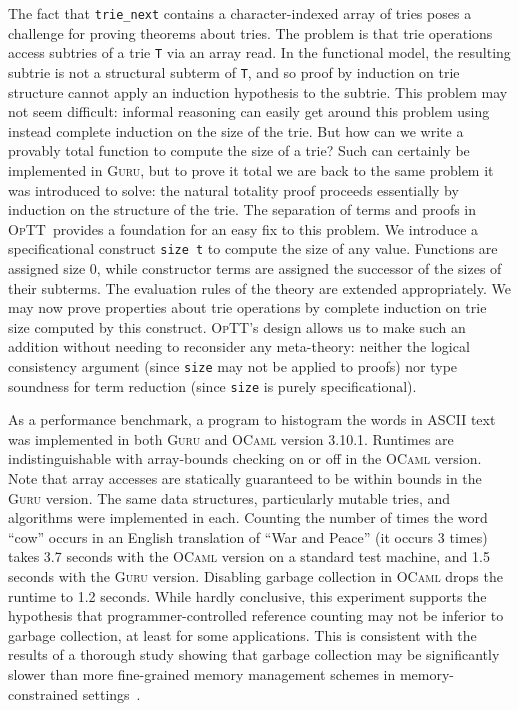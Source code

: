 \documentclass[preprint,natbib]{sigplanconf}
\newcommand{\optt}{\textsc{OpTT}}
\begin{document}
The fact that \texttt{trie\_next} contains a character-indexed array
of tries poses a challenge for proving theorems about tries.  The
problem is that trie operations access subtries of a trie \texttt{T}
via an array read.  In the functional model, the resulting subtrie is
not a structural subterm of \texttt{T}, and so proof by induction on
trie structure cannot apply an induction hypothesis to the subtrie.
This problem may not seem difficult: informal reasoning can easily get
around this problem using instead complete induction on the size of
the trie.  But how can we write a provably total function to compute
the size of a trie?  Such can certainly be implemented in
\textsc{Guru}, but to prove it total we are back to the same problem
it was introduced to solve: the natural totality proof proceeds
essentially by induction on the structure of the trie.  The separation
of terms and proofs in \optt\ provides a foundation for an easy fix to
this problem.  We introduce a specificational construct \texttt{size
t} to compute the size of any value.  Functions are assigned size 0,
while constructor terms are assigned the successor of the sizes of
their subterms.  The evaluation rules of the theory are extended
appropriately.  We may now prove properties about trie operations by
complete induction on trie size computed by this construct.  \optt's
design allows us to make such an addition without needing to
reconsider any meta-theory: neither the logical consistency argument
(since \texttt{size} may not be applied to proofs) nor type soundness
for term reduction (since \texttt{size} is purely specificational).

As a performance benchmark, a program to histogram the words in ASCII
text was implemented in both \textsc{Guru} and \textsc{OCaml} version
3.10.1.  Runtimes are indistinguishable with array-bounds checking on
or off in the \textsc{OCaml} version.  Note that array accesses are
statically guaranteed to be within bounds in the \textsc{Guru}
version.  The same data structures, particularly mutable tries, and
algorithms were implemented in each.  Counting the number of times the
word ``cow'' occurs in an English translation of ``War and Peace'' (it
occurs 3 times) takes 3.7 seconds with the \textsc{OCaml} version on a
standard test machine, and 1.5 seconds with the \textsc{Guru} version.
Disabling garbage collection in \textsc{OCaml} drops the runtime to
1.2 seconds.  While hardly conclusive, this experiment supports the
hypothesis that programmer-controlled reference counting may not be
inferior to garbage collection, at least for some applications.  This
is consistent with the results of a thorough study showing that
garbage collection may be significantly slower than more fine-grained
memory management schemes in memory-constrained
settings~\cite{hertz+05}.
\end{document}
